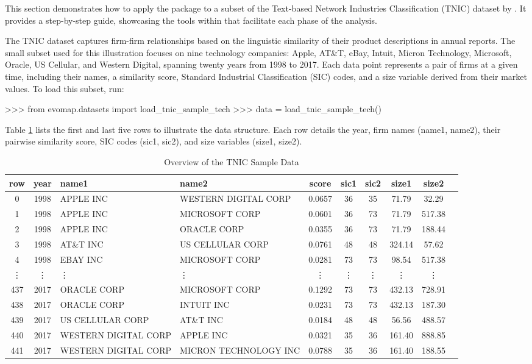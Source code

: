 \documentclass[article]{jss}
\begin{document}
This section demonstrates how to apply the  package to a subset 
of the Text-based Network Industries Classification (TNIC) dataset by \cite{Hoberg+Phillips:2016}. 
It provides a step-by-step guide, showcasing the tools within  that facilitate 
each phase of the analysis. 

The TNIC dataset captures firm-firm relationships based on the linguistic similarity of their product descriptions 
in annual reports. The small subset used for this illustration focuses on nine technology companies: 
Apple, AT\&T, eBay, Intuit, Micron Technology, Microsoft, Oracle, US Cellular, and Western Digital, 
spanning twenty years from 1998 to 2017. Each data point represents a pair of firms at a given time, 
including their names, a similarity score, Standard Industrial Classification (SIC) codes, 
and a size variable derived from their market values. To load this subset, run:

\begin{Code}
>>> from evomap.datasets import load_tnic_sample_tech
>>> data = load_tnic_sample_tech()
\end{Code}

Table \ref{tab:data-overview} lists the first and last five rows to illustrate the data structure. 
Each row details the year, firm names (name1, name2), their pairwise similarity score, SIC codes (sic1, sic2), and size
 variables (size1, size2).

\begin{table}[t!]
  \centering
  \begin{tabular}{ccp{3cm}p{3cm}cccccc}
  \hline
  row & year & name1 & name2 & score & sic1 & sic2 & size1 & size2 \\ 
  \hline
  0 & 1998 & APPLE INC & WESTERN DIGITAL CORP & 0.0657 & 36 & 35 & 71.79 & 32.29 \\
  1 & 1998 & APPLE INC & MICROSOFT CORP & 0.0601 & 36 & 73 & 71.79 & 517.38 \\
  2 & 1998 & APPLE INC & ORACLE CORP & 0.0355 & 36 & 73 & 71.79 & 188.44 \\
  3 & 1998 & AT\&T INC & US CELLULAR CORP & 0.0761 & 48 & 48 & 324.14 & 57.62 \\
  4 & 1998 & EBAY INC & MICROSOFT CORP & 0.0281 & 73 & 73 & 98.54 & 517.38 \\
  \vdots & \vdots & \vdots & \vdots & \vdots & \vdots & \vdots & \vdots & \vdots \\
  437 & 2017 & ORACLE CORP & MICROSOFT CORP & 0.1292 & 73 & 73 & 432.13 & 728.91 \\
  438 & 2017 & ORACLE CORP & INTUIT INC & 0.0231 & 73 & 73 & 432.13 & 187.30 \\
  439 & 2017 & US CELLULAR CORP & AT\&T INC & 0.0184 & 48 & 48 & 56.56 & 488.57 \\
  440 & 2017 & WESTERN DIGITAL CORP & APPLE INC & 0.0321 & 35 & 36 & 161.40 & 888.85 \\
  441 & 2017 & WESTERN DIGITAL CORP & MICRON TECHNOLOGY INC & 0.0788 & 35 & 36 & 161.40 & 188.55 \\
  \hline
  \end{tabular}
  \caption{Overview of the TNIC Sample Data} \label{tab:data-overview}
\end{table}
  
\end{document}
